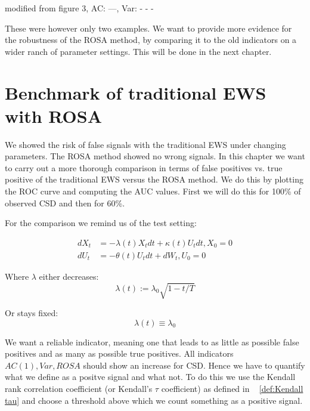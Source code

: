\documentclass[%
thesis=student,%
coverpage=false,%
titlepage=false,%
headmarks=true, %
german,%
font=libertine, %
math=newpxtx, %
BCOR=5mm,%
coverBCOR=11mm%
]{tumbook}
\begin{document}
    \begin{minipage}{\textwidth}
    \centering
    \label{false negative}
    modified from \cite{Morr:2024} figure 3, AC: ---, Var: - - -
\end{minipage}

These were however only two examples. We want to provide more evidence for the robustness of the ROSA method, by comparing it to the old indicators on a wider ranch of parameter settings. This will be done in the next chapter.
    


\chapter{Benchmark of traditional EWS with ROSA}

We showed the risk of false signals with the traditional EWS under changing parameters.
The ROSA method showed no wrong signals.
In this chapter we want to carry out a more thorough comparison in terms of false positives vs. true positive of the traditional EWS versus the ROSA method. We do this by plotting the ROC curve and computing the AUC values. First we will do this for 100\% of observed CSD and then for 60\%.

For the comparison we remind us of the test setting: 

\begin{subequations}
    \begin{align*}
        dX_{t} &= -\lambda(t) X_{t}dt + \kappa(t) U_{t}dt, X_{0} = 0 \\
        dU_{t} &= -\theta(t) U_{t}dt + dW_{t}, U_{0} = 0
    \end{align*}
\end{subequations}

Where $\lambda$ either decreases: 
    \[
    \lambda(t) := \lambda_{0}\sqrt{1-t/T}
    \]

Or stays fixed: 
    \[
    \lambda(t)\equiv\lambda_{0}
    \]

We want a reliable indicator, meaning one that leads to as little as possible false positives and as many as possible true positives. All indicators $AC(1),Var,ROSA$ should show an increase for CSD. Hence we have to quantify what we define as a positve signal and what not. To do this we use the Kendall rank correlation coefficient (or Kendall's $\tau$ coefficient) as defined in ~ \ref{def:Kendall tau} and choose a threshold above which we count something as a positive signal. 
\end{document}
